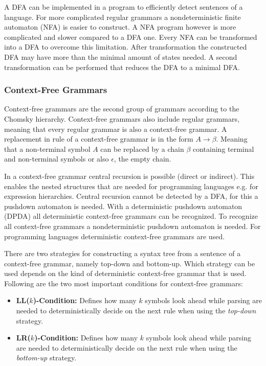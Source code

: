 A DFA can be implemented in a program to efficiently detect sentences of a language. For more complicated regular grammars a nondeterministic finite automaton (NFA) is easier to construct. A NFA program however is more complicated and slower compared to a DFA one. Every NFA can be transformed into a DFA to overcome this limitation. After transformation the constructed DFA may have more than the minimal amount of states needed. A second transformation can be performed that reduces the DFA to a minimal DFA. 

\subsubsection{Context-Free Grammars}

Context-free grammars are the second group of grammars according to the Chomsky hierarchy. Context-free grammars also include regular grammars, meaning that every regular grammar is also a context-free grammar. A replacement in rule of a context-free grammar is in the form $A \rightarrow \beta$. Meaning that a non-terminal symbol $A$ can be replaced by a chain $\beta$ containing terminal and non-terminal symbols or also $\epsilon$, the empty chain. 

In a context-free grammar central recursion is possible (direct or indirect). This enables the nested structures that are needed for programming languages e.g. for expression hierarchies. Central recursion cannot be detected by a DFA, for this a pushdown automaton is needed. With a deterministic pushdown automaton (DPDA) all deterministic context-free grammars can be recognized. To recognize all context-free grammars a nondeterministic pushdown automaton is needed. For programming languages deterministic context-free grammars are used. 

There are two strategies for constructing a syntax tree from a sentence of a context-free grammar, namely top-down and bottom-up. Which strategy can be used depends on the kind of deterministic context-free grammar that is used. Following are the two most important conditions for context-free grammars:

\begin{itemize}
    \item \textbf{LL($k$)-Condition:} Defines how many $k$ symbols look ahead while parsing are needed to deterministically decide on the next rule when using the \textit{top-down} strategy.
    \item \textbf{LR($k$)-Condition:} Defines how many $k$ symbols look ahead while parsing are needed to deterministically decide on the next rule when using the \textit{bottom-up} strategy.
\end{itemize}

